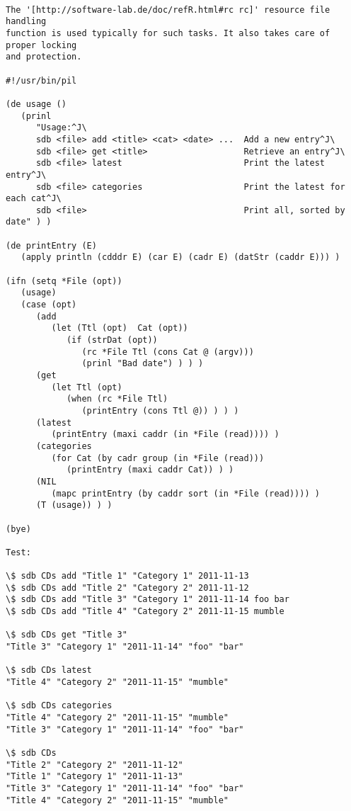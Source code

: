 \begin{verbatim}

The '[http://software-lab.de/doc/refR.html#rc rc]' resource file handling
function is used typically for such tasks. It also takes care of proper locking
and protection.

#!/usr/bin/pil

(de usage ()
   (prinl
      "Usage:^J\
      sdb <file> add <title> <cat> <date> ...  Add a new entry^J\
      sdb <file> get <title>                   Retrieve an entry^J\
      sdb <file> latest                        Print the latest entry^J\
      sdb <file> categories                    Print the latest for each cat^J\
      sdb <file>                               Print all, sorted by date" ) )

(de printEntry (E)
   (apply println (cdddr E) (car E) (cadr E) (datStr (caddr E))) )

(ifn (setq *File (opt))
   (usage)
   (case (opt)
      (add
         (let (Ttl (opt)  Cat (opt))
            (if (strDat (opt))
               (rc *File Ttl (cons Cat @ (argv)))
               (prinl "Bad date") ) ) )
      (get
         (let Ttl (opt)
            (when (rc *File Ttl)
               (printEntry (cons Ttl @)) ) ) )
      (latest
         (printEntry (maxi caddr (in *File (read)))) )
      (categories
         (for Cat (by cadr group (in *File (read)))
            (printEntry (maxi caddr Cat)) ) )
      (NIL
         (mapc printEntry (by caddr sort (in *File (read)))) )
      (T (usage)) ) )

(bye)

Test:

\$ sdb CDs add "Title 1" "Category 1" 2011-11-13
\$ sdb CDs add "Title 2" "Category 2" 2011-11-12
\$ sdb CDs add "Title 3" "Category 1" 2011-11-14 foo bar
\$ sdb CDs add "Title 4" "Category 2" 2011-11-15 mumble

\$ sdb CDs get "Title 3"
"Title 3" "Category 1" "2011-11-14" "foo" "bar"

\$ sdb CDs latest
"Title 4" "Category 2" "2011-11-15" "mumble"

\$ sdb CDs categories
"Title 4" "Category 2" "2011-11-15" "mumble"
"Title 3" "Category 1" "2011-11-14" "foo" "bar"

\$ sdb CDs
"Title 2" "Category 2" "2011-11-12"
"Title 1" "Category 1" "2011-11-13"
"Title 3" "Category 1" "2011-11-14" "foo" "bar"
"Title 4" "Category 2" "2011-11-15" "mumble"

\end{verbatim}

